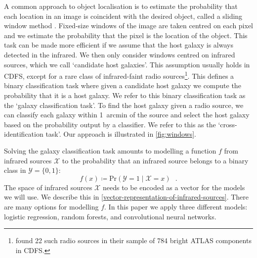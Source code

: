 \documentclass[fleqn,usenatbib,usedcolumn]{mnras}
\begin{document}
    A common approach to object localisation is to estimate the probability
    that each location in an image is coincident with the desired object,
    called a sliding window method \citep[e.g.][]{rowley1996facedetection}.
    Fixed-size windows of the image are taken centred on each pixel and we
    estimate the probability that the pixel is the location of the object.
    This task can be made more efficient if we assume that the host galaxy is
    always detected in the infrared. We then only consider windows centred on
    infrared sources, which we call `candidate host galaxies'. This assumption
    usually holds in CDFS, except for a rare class of infrared-faint radio
    sources\footnote{\citet{norris06} found 22 such radio sources in their
    sample of 784 bright ATLAS components in CDFS.}. This defines a binary
    classification task where given a candidate host galaxy we compute the
    probability that it is a host galaxy. We refer to this binary
    classification task as the `galaxy classification task'. To find the host
    galaxy given a radio source, we can classify each galaxy within 1~arcmin
    of the source and select the host galaxy based on the probability output
    by a classifier. We refer to this as the `cross-identification task'. Our
    approach is illustrated in \autoref{fig:windows}.

    Solving the galaxy classification task amounts to modelling a function $f$
    from infrared sources $\mathcal{X}$ to the probability that an infrared
    source belongs to a binary class in $\mathcal{Y} = \{0, 1\}$:
    \begin{equation}
        f(x) \coloneqq \text{Pr}\left(\mathcal{Y} = 1 \mid \mathcal X = x\right)\,\,\,\,.
    \end{equation}
    The space of infrared sources $\mathcal{X}$ needs to be encoded as a vector
    for the models we will use. We describe this in
    \autoref{vector-representation-of-infrared-sources}. There are many options
    for modelling $f$. In this paper we apply three different models: logistic
    regression, random forests, and convolutional neural networks.
\end{document}
